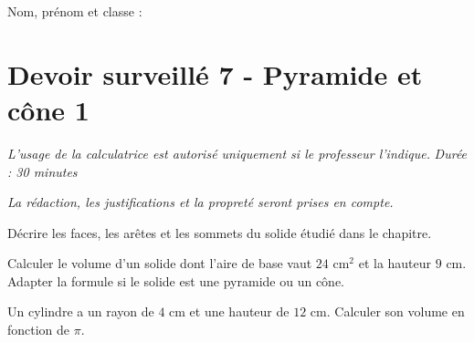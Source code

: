 \documentclass[a4paper,10pt]{report}
\begin{document}
\pagestyle{empty}
\noindent Nom, prénom et classe : \dotfill

\section*{Devoir surveillé 7 - Pyramide et cône 1}

\noindent \textit{L'usage de la calculatrice est autorisé uniquement si le professeur l'indique.} \hfill \textit{Durée : 30 minutes}

\medskip
\noindent \textit{La rédaction, les justifications et la propreté seront prises en compte.}


\begin{ex}[Vocabulaire]
Décrire les faces, les arêtes et les sommets du solide étudié dans le chapitre.
\medskip\noindent\grandscarreaux{\linewidth}{3cm}
\end{ex}
\begin{ex}[Volume]
Calculer le volume d'un solide dont l'aire de base vaut $24$ cm$^2$ et la hauteur $9$ cm. Adapter la formule si le solide est une pyramide ou un cône.
\medskip\noindent\grandscarreaux{\linewidth}{4cm}
\end{ex}
\begin{ex}[Problème]
Un cylindre a un rayon de $4$ cm et une hauteur de $12$ cm. Calculer son volume en fonction de $\pi$.
\medskip\noindent\grandscarreaux{\linewidth}{4cm}
\end{ex}
\end{document}
